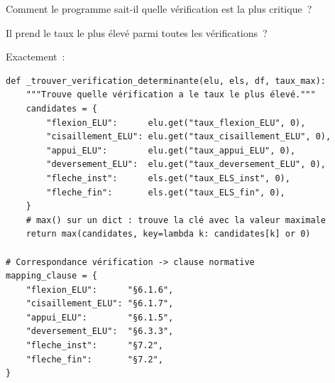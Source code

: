 \begin{maitre}
Comment le programme sait-il quelle v\'erification est la plus critique~?
\end{maitre}

\begin{apprenti}
Il prend le taux le plus \'elev\'e parmi toutes les v\'erifications~?
\end{apprenti}

\begin{maitre}
Exactement~:
\end{maitre}

\begin{lstlisting}[style=python, caption={Extrait de \fichier{moteur.py} --- vérification déterminante}]
def _trouver_verification_determinante(elu, els, df, taux_max):
    """Trouve quelle vérification a le taux le plus élevé."""
    candidates = {
        "flexion_ELU":      elu.get("taux_flexion_ELU", 0),
        "cisaillement_ELU": elu.get("taux_cisaillement_ELU", 0),
        "appui_ELU":        elu.get("taux_appui_ELU", 0),
        "deversement_ELU":  elu.get("taux_deversement_ELU", 0),
        "fleche_inst":      els.get("taux_ELS_inst", 0),
        "fleche_fin":       els.get("taux_ELS_fin", 0),
    }
    # max() sur un dict : trouve la clé avec la valeur maximale
    return max(candidates, key=lambda k: candidates[k] or 0)

# Correspondance vérification -> clause normative
mapping_clause = {
    "flexion_ELU":      "§6.1.6",
    "cisaillement_ELU": "§6.1.7",
    "appui_ELU":        "§6.1.5",
    "deversement_ELU":  "§6.3.3",
    "fleche_inst":      "§7.2",
    "fleche_fin":       "§7.2",
}
\end{lstlisting}
